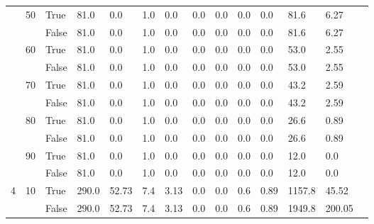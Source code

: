 \begin{appendices}
\begin{landscape}
\begin{small}
\begin{longtable}[c]{@{}lll|ll|ll|ll|ll|lll@{}}
   & 50 & True  & 81.0            & 0.0            & 1.0           & 0.0           & 0.0           & 0.0           & 0.0           & 0.0           & 81.6          & 6.27        &  \\
   &    & False & 81.0            & 0.0            & 1.0           & 0.0           & 0.0           & 0.0           & 0.0           & 0.0           & 81.6          & 6.27        &  \\
   & 60 & True  & 81.0            & 0.0            & 1.0           & 0.0           & 0.0           & 0.0           & 0.0           & 0.0           & 53.0          & 2.55        &  \\
   &    & False & 81.0            & 0.0            & 1.0           & 0.0           & 0.0           & 0.0           & 0.0           & 0.0           & 53.0          & 2.55        &  \\
   & 70 & True  & 81.0            & 0.0            & 1.0           & 0.0           & 0.0           & 0.0           & 0.0           & 0.0           & 43.2          & 2.59        &  \\
   &    & False & 81.0            & 0.0            & 1.0           & 0.0           & 0.0           & 0.0           & 0.0           & 0.0           & 43.2          & 2.59        &  \\
   & 80 & True  & 81.0            & 0.0            & 1.0           & 0.0           & 0.0           & 0.0           & 0.0           & 0.0           & 26.6          & 0.89        &  \\
   &    & False & 81.0            & 0.0            & 1.0           & 0.0           & 0.0           & 0.0           & 0.0           & 0.0           & 26.6          & 0.89        &  \\
   & 90 & True  & 81.0            & 0.0            & 1.0           & 0.0           & 0.0           & 0.0           & 0.0           & 0.0           & 12.0          & 0.0         &  \\
   &    & False & 81.0            & 0.0            & 1.0           & 0.0           & 0.0           & 0.0           & 0.0           & 0.0           & 12.0          & 0.0         &  \\
  \midrule
4  & 10 & True  & 290.0           & 52.73          & 7.4           & 3.13          & 0.0           & 0.0           & 0.6           & 0.89          & 1157.8        & 45.52       &  \\
   &    & False & 290.0           & 52.73          & 7.4           & 3.13          & 0.0           & 0.0           & 0.6           & 0.89          & 1949.8        & 200.05      &  \\

\end{longtable}
\end{small}
\end{landscape}
\end{appendices}
